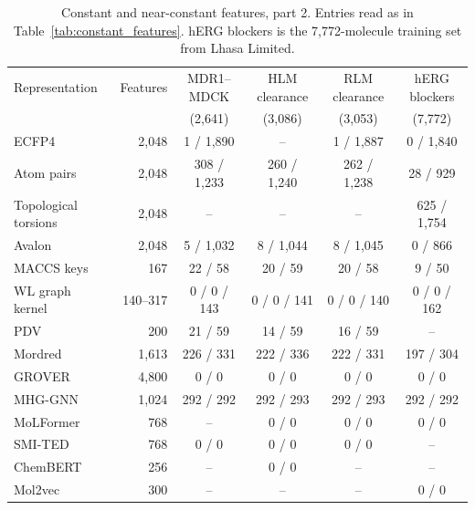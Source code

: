 \begin{table}[htbp]
\centering
\small
\setlength{\tabcolsep}{4pt}
\caption{Constant and near-constant features, part 2. Entries read as in Table~\ref{tab:constant_features}. hERG blockers is the 7,772-molecule training set from Lhasa Limited.}
\label{tab:constant_features_b}
\begin{tabular}{lrcccc}
\toprule
Representation & Features & MDR1--MDCK & HLM clearance & RLM clearance & hERG blockers \\
 & & (2,641) & (3,086) & (3,053) & (7,772) \\
\midrule
ECFP4 & 2,048 & 1 / 1,890 & -- & 1 / 1,887 & 0 / 1,840 \\
Atom pairs & 2,048 & 308 / 1,233 & 260 / 1,240 & 262 / 1,238 & 28 / 929 \\
Topological torsions & 2,048 & -- & -- & -- & 625 / 1,754 \\
Avalon & 2,048 & 5 / 1,032 & 8 / 1,044 & 8 / 1,045 & 0 / 866 \\
MACCS keys & 167 & 22 / 58 & 20 / 59 & 20 / 58 & 9 / 50 \\
WL graph kernel & 140--317 & 0 / 0 / 143 & 0 / 0 / 141 & 0 / 0 / 140 & 0 / 0 / 162 \\
PDV & 200 & 21 / 59 & 14 / 59 & 16 / 59 & -- \\
Mordred & 1,613 & 226 / 331 & 222 / 336 & 222 / 331 & 197 / 304 \\
GROVER & 4,800 & 0 / 0 & 0 / 0 & 0 / 0 & 0 / 0 \\
MHG-GNN & 1,024 & 292 / 292 & 292 / 293 & 292 / 293 & 292 / 292 \\
MoLFormer & 768 & -- & 0 / 0 & 0 / 0 & 0 / 0 \\
SMI-TED & 768 & 0 / 0 & 0 / 0 & 0 / 0 & -- \\
ChemBERT & 256 & -- & 0 / 0 & -- & -- \\
Mol2vec & 300 & -- & -- & -- & 0 / 0 \\
\bottomrule
\end{tabular}
\end{table}
